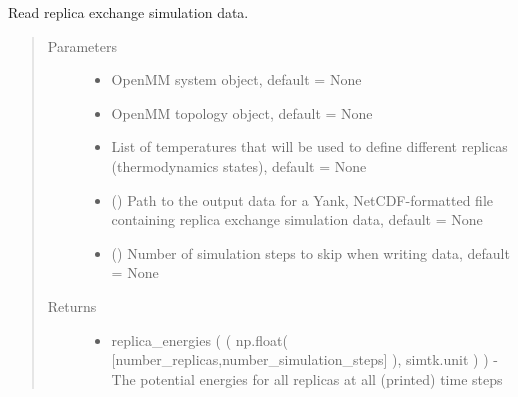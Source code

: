 \documentclass[letterpaper,12pt,english,openany,oneside]{sphinxmanual}
\begin{document}
\begin{fulllineitems}
\label{\detokenize{simulation:simulation.rep_exch.read_replica_exchange_data}}
Read replica exchange simulation data.
\begin{quote}\begin{description}
\item[{Parameters}] \leavevmode\begin{itemize}
\item {} 
 \textendash{} OpenMM system object, default = None

\item {} 
 \textendash{} OpenMM topology object, default = None

\item {} 
 \textendash{} List of temperatures that will be used to define different replicas (thermodynamics states), default = None

\item {} 
 () \textendash{} Path to the output data for a Yank, NetCDF-formatted file containing replica exchange simulation data, default = None

\item {} 
 () \textendash{} Number of simulation steps to skip when writing data, default = None

\end{itemize}

\item[{Returns}] \leavevmode
\begin{itemize}
\item {} 
replica\_energies (  ( np.float( {[}number\_replicas,number\_simulation\_steps{]} ), simtk.unit ) ) - The potential energies for all replicas at all (printed) time steps


\end{itemize}
\end{description}
\end{quote}
\end{fulllineitems}
\end{document}
